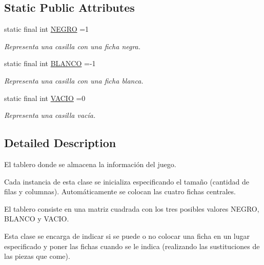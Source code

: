 \subsection*{Static Public Attributes}
\begin{DoxyCompactItemize}
\item 
\mbox{\label{class_tablero_a0ef9ac784851be4a99984b6a2dcede58}} 
static final int \mbox{\hyperlink{class_tablero_a0ef9ac784851be4a99984b6a2dcede58}{N\+E\+G\+RO}} =1
\begin{DoxyCompactList}\small\item\em Representa una casilla con una ficha negra. \end{DoxyCompactList}\item 
\mbox{\label{class_tablero_a28a1e0a4c4362e5cbcb2505b660c6855}} 
static final int \mbox{\hyperlink{class_tablero_a28a1e0a4c4362e5cbcb2505b660c6855}{B\+L\+A\+N\+CO}} =-\/1
\begin{DoxyCompactList}\small\item\em Representa una casilla con una ficha blanca. \end{DoxyCompactList}\item 
\mbox{\label{class_tablero_abbd0033f1dfd3e3d30c1b11472d057c9}} 
static final int \mbox{\hyperlink{class_tablero_abbd0033f1dfd3e3d30c1b11472d057c9}{V\+A\+C\+IO}} =0
\begin{DoxyCompactList}\small\item\em Representa una casilla vacía. \end{DoxyCompactList}\end{DoxyCompactItemize}


\subsection{Detailed Description}
El tablero donde se almacena la información del juego. 

Cada instancia de esta clase se inicializa especificando el tamaño (cantidad de filas y columnas). Automáticamente se colocan las cuatro fichas centrales.

El tablero consiste en una matriz cuadrada con los tres posibles valores N\+E\+G\+RO, B\+L\+A\+N\+CO y V\+A\+C\+IO.

Esta clase se encarga de indicar si se puede o no colocar una ficha en un lugar especificado y poner las fichas cuando se le indica (realizando las sustituciones de las piezas que come). 


